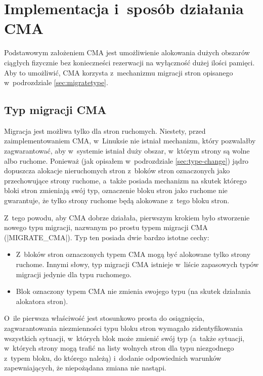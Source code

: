 \chapter{Implementacja i~sposób działania CMA}

Podstawowym założeniem CMA jest umożliwienie alokowania dużych
obszarów ciągłych fizycznie bez konieczneści rezerwacji na wyłączność
dużej ilości pamięci.  Aby to umożliwić, CMA korzysta z~mechanizmu
migracji stron opisanego w~podrozdziale \ref{sec:migratetype}.

\section{Typ migracji CMA}\label{sec:migrate-cma}

Migracja jest możliwa tylko dla stron ruchomych.  Niestety, przed
zaimplementowaniem CMA, w~Linuksie nie istniał mechanizm, który
pozwalałby zagwarantować, aby w~systemie istniał duży obszar, w~którym
strony są wolne albo ruchome.  Ponieważ (jak opisałem w~podrozdziale
\ref{sec:type-change}) jądro dopuszcza alokacje nieruchomych stron
z~bloków stron oznaczonych jako przechowujące strony ruchome, a~także
posiada mechanizm na skutek którego bloki stron zmieniają swój typ,
oznaczenie bloku stron jako ruchome nie gwarantuje, że tylko strony
ruchome będą alokowane z~tego bloku stron.

Z~tego powodu, aby CMA dobrze działała, pierwszym krokiem było
stworzenie nowego typu migracji, nazwanym po prostu typem migracji CMA
(\code|MIGRATE_CMA|).  Typ ten posiada dwie bardzo istotne cechy:

\begin{itemize}
\item Z~bloków stron oznaczonych typem CMA mogą być alokowane tylko
  strony ruchome.  Innymi słowy, typ migracji CMA istnieje w~liście
  zapasowych typów migracji jedynie dla typu ruchomego.
\item Blok oznaczony typem CMA nie zmienia swojego typu (na skutek
  działania alokatora stron).
\end{itemize}

O~ile pierwsza właściwość jest stosunkowo prosta do osiągnięcia,
zagwarantowania niezmienności typu bloku stron wymagało
zidentyfikowania wszystkich sytuacji, w~których blok może zmienić swój
typ (a~także sytuacji, w~których strony mogą trafić na listy wolnych
stron dla typu niezgodnego z~typem bloku, do którego należą) i~dodanie
odpowiednich warunków zapewniających, że niepożądana zmiana nie
nastąpi.

